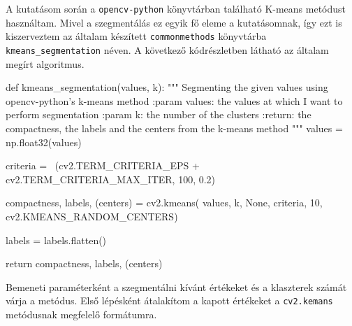 A kutatásom során a \texttt{opencv-python} könyvtárban található K-means metódust használtam. Mivel a szegmentálás ez egyik fő eleme a kutatásomnak, így ezt is kiszerveztem az általam készített \texttt{commonmethods} könyvtárba \texttt{kmeans\_segmentation} néven. A következő kódrészletben látható az általam megírt algoritmus.
\begin{python}
def kmeans_segmentation(values, k):
    """
    Segmenting the given values using opencv-python's k-means method
    :param values: the values at which I want to perform segmentation
    :param k: the number of the clusters
    :return: the compactness, the labels and
        the centers from the k-means method
    """
    values = np.float32(values)

    criteria = \
        (cv2.TERM_CRITERIA_EPS + cv2.TERM_CRITERIA_MAX_ITER, 100, 0.2)

    compactness, labels, (centers) = cv2.kmeans(
        values,
        k,
        None,
        criteria,
        10,
        cv2.KMEANS_RANDOM_CENTERS)

    labels = labels.flatten()

    return compactness, labels, (centers)
\end{python}

Bemeneti paraméterként a szegmentálni kívánt értékeket és a klaszterek számát várja a metódus. Első lépésként átalakítom a kapott értékeket a \texttt{cv2.kemans} metódusnak megfelelő formátumra.

